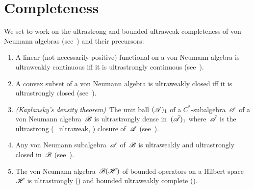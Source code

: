 \documentclass[a]{subfiles}
\begin{document}
\section{Completeness}
\begin{parsec}%
\begin{point}%
We set to work on the ultrastrong and bounded ultraweak completeness
of von Neumann algebras (see~) and their precursors:
\begin{enumerate}
\item
A linear (not necessarily positive)
functional on a von Neumann algebra
is ultraweakly continuous iff it is ultrastrongly continuous
(see~).
\item
A convex subset of a von Neumann algebra
is ultraweakly closed iff it is ultrastrongly closed
(see~).
\item
\emph{(Kaplansky's density theorem)}\ 
The unit ball $(\mathscr{A})_1$
of a $C^*$-subalgebra~$\mathscr{A}$
of a von Neumann algebra~$\mathscr{B}$
is ultrastrongly dense in~$(\bar{\mathscr{A}})_1$
where~$\bar{\mathscr{A}}$ is the ultrastrong (=ultraweak,
) closure of~$\mathscr{A}$
(see~).
\item
Any von Neumann subalgebra~$\mathscr{A}$
of~$\mathscr{B}$ is ultraweakly and ultrastrongly
closed in~$\mathscr{B}$
(see~).
\item
The von Neumann algebra~$\mathscr{B}(\mathscr{H})$ 
of bounded operators on a Hilbert space~$\mathscr{H}$
is ultrastrongly 
()
and bounded ultraweakly complete
().
\end{enumerate}

\end{point}
\end{parsec}
\end{document}
